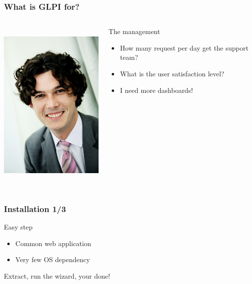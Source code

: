 \documentclass{beamer}
\begin{document}
\begin{frame}
    \frametitle{What is GLPI for?}

 \begin{columns}
 \begin{column}{0.15\textwidth}
         \includegraphics[height=8.5cm]{./pics/manager.jpg}
 \end{column}
 \begin{column}{1.25\textwidth}
    \begin{block}{The management}
        \begin{itemize}
            \item How many request per day get the support team?
            \item What is the user satisfaction level?
            \item I need more dashboards!
        \end{itemize}
    \end{block}
 \end{column}
\end{columns}


\end{frame}




\begin{frame}
    \frametitle{Installation 1/3}

    \begin{block}{Easy step}
        \begin{itemize}
            \item Common web application
            \item Very few OS dependency
        \end{itemize}
    \end{block}

    Extract, run the wizard, your done!





\end{frame}
\end{document}
